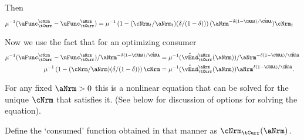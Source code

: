\documentclass[./SolvingMicroDSOPs]{subfiles}
\begin{document}
		Then
		\begin{align}
			\muInv(\uFunc^{\cNrm}_{\tCurr}-\uFunc^{\aNrm}_{\tCurr}) & = \muInv\left(1-(\cNrm_{t}/\aNrm_{t})(\wealthU/(1-\wealthU))\right)(\aNrm^{-\wealthU(1-\CRRA)/\grave{\CRRA}})\cNrm_{t}
		\end{align}
		
		Now we use the fact that for an optimizing consumer
		\begin{align}
			\muInv(\uFunc^{\cNrm}_{\tCurr}-\uFunc^{\aNrm}_{\tCurr})/\aNrm^{-\wealthU(1-\CRRA)/\grave{\CRRA}} & = \muInv(\Maxed{\vEnd}_{\tCurr}^{\aNrm}(\aNrm))/\aNrm^{-\wealthU(1-\CRRA)/\grave{\CRRA}} \label{aInUFOC}
			\\ \muInv\left(1-(\cNrm/\aNrm)(\wealthU/(1-\wealthU))\right)\cNrm & = \muInv(\Maxed{\vEnd}_{\tCurr}^{\aNrm}(\aNrm)) \aNrm^{\wealthU(1-\CRRA)/\grave{\CRRA}} \notag.
		\end{align}
		
		For any fixed $\aNrm>0$ this is a nonlinear equation that can be solved for the unique $\cNrm$ that satisfies it.  (See below for discussion of options for solving the equation).
		
		Define the `consumed' function obtained in that manner as $\mathfrak{\cNrm}_{\tCurr}(\aNrm)$.
		
\end{document}
